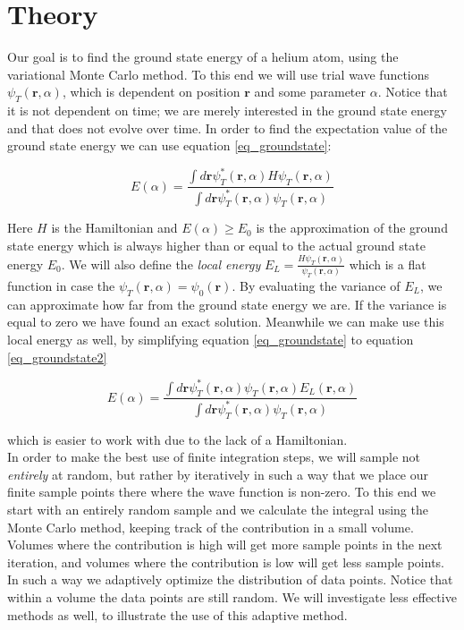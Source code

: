 \section{Theory}

Our goal is to find the ground state energy of a helium atom, using the variational Monte Carlo method. To this end we will use trial wave functions $\psi_T(\textbf{r},\alpha)$, which is dependent on position $\textbf{r}$ and some parameter $\alpha$. Notice that it is not dependent on time; we are merely interested in the ground state energy and that does not evolve over time. In order to find the expectation value of the ground state energy we can use equation \ref{eq_groundstate}: 

\begin{equation}\label{eq_groundstate}
E(\alpha) = \frac{\int d\textbf{r} \psi_T^*(\textbf{r},\alpha)H\psi_T(\textbf{r},\alpha)}{\int d\textbf{r} \psi_T^*(\textbf{r},\alpha)\psi_T(\textbf{r},\alpha)}
\end{equation}

Here $H$ is the Hamiltonian and $E(\alpha) \geq E_0$ is the approximation of the ground state energy which is always higher than or equal to the actual ground state energy $E_0$.  We will also define the \textit{local energy} $E_L = \frac{H\psi_T(\textbf{r},\alpha)}{\psi_T(\textbf{r},\alpha)}$ which is a flat function in case the $\psi_T(\textbf{r},\alpha) = \psi_0(\textbf{r})$. By evaluating the variance of $E_L$, we can approximate how far from the ground state energy we are. If the variance is equal to zero we have found an exact solution. Meanwhile we can make use this local energy as well, by simplifying equation \ref{eq_groundstate} to equation \ref{eq_groundstate2}

\begin{equation}\label{eq_groundstate2}
E(\alpha) = \frac{\int d\textbf{r} \psi_T^*(\textbf{r},\alpha)\psi_T(\textbf{r},\alpha)E_L(\textbf{r},\alpha)}{\int d\textbf{r} \psi_T^*(\textbf{r},\alpha)\psi_T(\textbf{r},\alpha)}
\end{equation}

which is easier to work with due to the lack of a Hamiltonian. \\

In order to make the best use of finite integration steps, we will sample not \textit{entirely} at random, but rather by iteratively in such a way that we place our finite sample points there where the wave function is non-zero. To this end we start with an entirely random sample and we calculate the integral using the Monte Carlo method, keeping track of the contribution in a small volume. Volumes where the contribution is high will get more sample points in the next iteration, and volumes where the contribution is low will get less sample points. In such a way we adaptively optimize the distribution of data points. Notice that within a volume the data points are still random. We will investigate less effective methods as well, to illustrate the use of this adaptive method. 